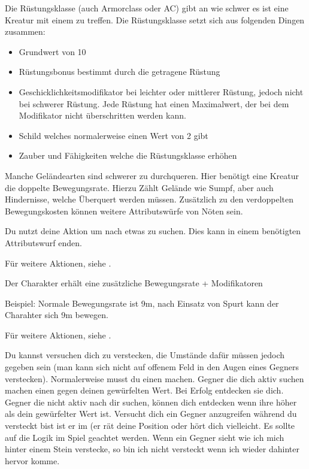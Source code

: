 Die Rüstungsklasse (auch Armorclass oder AC) gibt an wie schwer es ist eine Kreatur mit einem  zu treffen. Die Rüstungsklasse setzt sich aus folgenden Dingen zusammen:
\begin{itemize}
\item Grundwert von 10
\item Rüstungsbonus bestimmt durch die getragene Rüstung
\item Geschicklichkeitsmodifikator bei leichter oder mittlerer Rüstung, jedoch nicht bei schwerer Rüstung. Jede Rüstung hat einen Maximalwert, der bei dem Modifikator nicht überschritten werden kann.
\item Schild welches normalerweise einen Wert von 2 gibt
\item Zauber und Fähigkeiten welche die Rüstungsklasse erhöhen
\end{itemize}



Manche Geländearten sind schwerer zu durchqueren. Hier benötigt eine Kreatur die doppelte Bewegungsrate. Hierzu Zählt Gelände wie Sumpf, aber auch Hindernisse, welche Überquert werden müssen. Zusätzlich zu den verdoppelten Bewegungskosten können weitere Attributswürfe von Nöten sein.



Du nutzt deine Aktion um nach etwas zu suchen. Dies kann in einem benötigten Attributswurf enden.

Für weitere Aktionen, siehe .



Der Charakter erhält eine zusätzliche Bewegungsrate + Modifikatoren

Beispiel: Normale Bewegungsrate ist 9m, nach Einsatz von Spurt kann der Charahter sich 9m bewegen.

Für weitere Aktionen, siehe .



Du kannst versuchen dich zu verstecken, die Umstände dafür müssen jedoch gegeben sein (man kann sich nicht auf offenem Feld in den Augen eines Gegners verstecken). Normalerweise musst du einen  machen. Gegner die dich aktiv suchen machen einen  gegen deinen gewürfelten Wert. Bei Erfolg entdecken sie dich. Gegner die nicht aktiv nach dir suchen, können dich entdecken wenn ihre  höher als dein gewürfelter Wert ist. Versucht dich ein Gegner anzugreifen während du versteckt bist ist er im  (er rät deine Position oder hört dich vielleicht. Es sollte auf die Logik im Spiel geachtet werden. Wenn ein Gegner sieht wie ich mich hinter einem Stein verstecke, so bin ich nicht versteckt wenn ich wieder dahinter hervor komme.

